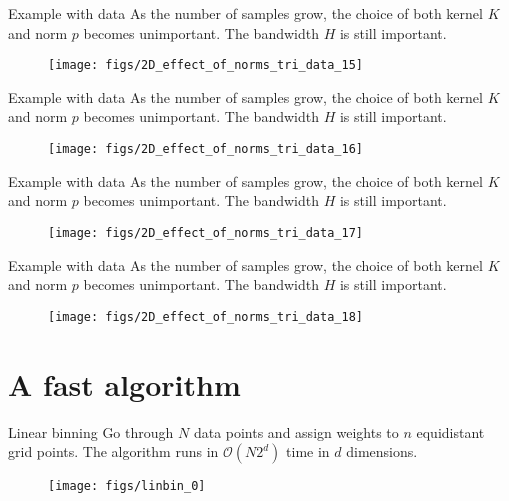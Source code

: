 \documentclass[11pt, aspectratio=149]{beamer}
\theoremstyle{plain}
\begin{document}
\begin{frame}[fragile, t]{Example with data}
	As the number of samples grow, the choice of both kernel $K$ and norm $p$ becomes unimportant. The bandwidth $H$ is still important.
	\vfill
	\begin{figure}
		\centering
		\texttt{[image: figs/2D\_effect\_of\_norms\_tri\_data\_15]}
	\end{figure}
\end{frame}


\begin{frame}[fragile, t]{Example with data}
	As the number of samples grow, the choice of both kernel $K$ and norm $p$ becomes unimportant. The bandwidth $H$ is still important.
	\vfill
	\begin{figure}
		\centering
		\texttt{[image: figs/2D\_effect\_of\_norms\_tri\_data\_16]}
	\end{figure}
\end{frame}


\begin{frame}[fragile, t]{Example with data}
	As the number of samples grow, the choice of both kernel $K$ and norm $p$ becomes unimportant. The bandwidth $H$ is still important.
	\vfill
	\begin{figure}
		\centering
		\texttt{[image: figs/2D\_effect\_of\_norms\_tri\_data\_17]}
	\end{figure}
\end{frame}


\begin{frame}[fragile, t]{Example with data}
	As the number of samples grow, the choice of both kernel $K$ and norm $p$ becomes unimportant. The bandwidth $H$ is still important.
	\vfill
	\begin{figure}
		\centering
		\texttt{[image: figs/2D\_effect\_of\_norms\_tri\_data\_18]}
	\end{figure}
\end{frame}



\section{A fast algorithm}


\begin{frame}[fragile, t]{Linear binning}
	Go through $N$ data points and assign weights to $n$ equidistant grid points. The algorithm runs in $\mathcal{O}(N2^d)$ time in $d$ dimensions.
	\vfill
	\begin{figure}
		\centering
		\texttt{[image: figs/linbin\_0]}
	\end{figure}
\end{frame}
\end{document}
